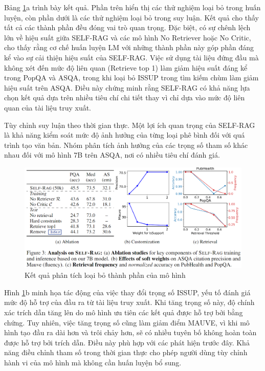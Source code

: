 \documentclass{article}
\begin{document}
Bảng \ref{fig:ablation_studies}a trình bày kết quả. Phần trên hiển thị các thử nghiệm loại bỏ trong huấn luyện, còn phần dưới là các thử nghiệm loại bỏ trong suy luận. Kết quả cho thấy tất cả các thành phần đều đóng vai trò quan trọng. Đặc biệt, có sự chênh lệch lớn về hiệu suất giữa SELF-RAG và các mô hình No Retriever hoặc No Critic, cho thấy rằng cơ chế huấn luyện LM với những thành phần này góp phần đáng kể vào sự cải thiện hiệu suất của SELF-RAG. Việc sử dụng tài liệu đứng đầu mà không xét đến mức độ liên quan (Retrieve top 1) làm giảm hiệu suất đáng kể trong PopQA và ASQA, trong khi loại bỏ ISSUP trong tìm kiếm chùm làm giảm hiệu suất trên ASQA. Điều này chứng minh rằng SELF-RAG có khả năng lựa chọn kết quả dựa trên nhiều tiêu chí chi tiết thay vì chỉ dựa vào mức độ liên quan của tài liệu truy xuất.

Tùy chỉnh suy luận theo thời gian thực. Một lợi ích quan trọng của SELF-RAG là khả năng kiểm soát mức độ ảnh hưởng của từng loại phê bình đối với quá trình tạo văn bản. Nhóm phân tích ảnh hưởng của các trọng số tham số khác nhau đối với mô hình 7B trên ASQA, nơi có nhiều tiêu chí đánh giá.

\begin{figure} 
    \centering
    \includegraphics[scale = 0.7]{ablation_studies.png}
    \caption{Kết quả phân tích loại bỏ thành phần của mô hình}
    \label{fig:ablation_studies}
\end{figure}

Hình \ref{fig:ablation_studies}b minh họa tác động của việc thay đổi trọng số ISSUP, yếu tố đánh giá mức độ hỗ trợ của đầu ra từ tài liệu truy xuất. Khi tăng trọng số này, độ chính xác trích dẫn tăng lên do mô hình ưu tiên các kết quả được hỗ trợ bởi bằng chứng. Tuy nhiên, việc tăng trọng số cũng làm giảm điểm MAUVE, vì khi mô hình tạo đầu ra dài hơn và trôi chảy hơn, sẽ có nhiều tuyên bố không hoàn toàn được hỗ trợ bởi trích dẫn. Điều này phù hợp với các phát hiện trước đây. Khả năng điều chỉnh tham số trong thời gian thực cho phép người dùng tùy chỉnh hành vi của mô hình mà không cần huấn luyện bổ sung.
\end{document}
